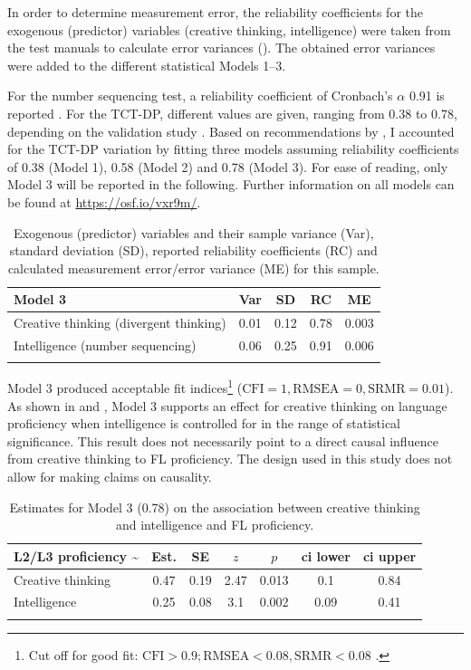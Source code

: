 \documentclass[output=paper]{langsci/langscibook}
\begin{document}
In order to determine measurement error, the reliability coefficients for the exogenous (predictor) variables (creative thinking, intelligence) were taken from the test manuals to calculate error variances (). The obtained error variances were added to the different statistical Models 1--3. 

For the number sequencing test, a reliability coefficient of Cronbach's $\alpha$ 0.91 is reported \citep{Weiss2006}. For the TCT-DP, different values are given, ranging from 0.38 to 0.78, depending on the validation study \citep{UrbanJellen1995}. Based on recommendations by \citet{WestfallYarkoni2016}, I accounted for the TCT-DP variation by fitting three models assuming reliability coefficients of 0.38 (Model 1), 0.58 (Model 2) and 0.78 (Model 3). For ease of reading, only Model 3 will be reported in the following. Further information on all models can be found at \url{https://osf.io/vxr9m/}.\largerpage 

\begin{table}
\caption{\label{tab:06:1}Exogenous (predictor) variables and their sample variance (Var), standard deviation (SD), reported reliability coefficients (RC) and calculated measurement error/error variance (ME) for this sample.}
\begin{tabular}{l cccc} 
\lsptoprule
Model 3 & {Var} & {SD} & {RC} & {ME} \\\midrule
Creative thinking (divergent thinking)      & 0.01 & 0.12 & 0.78 & 0.003\\
Intelligence (number sequencing)         & 0.06 & 0.25 & 0.91 & 0.006\\
\lspbottomrule
\end{tabular}
\end{table}

Model 3 produced acceptable fit indices\footnote{Cut off for good fit: $\text{CFI} > 0.9; \text{RMSEA} < 0.08, \text{SRMR} < 0.08$ \citep{Kline2011}.} ($\text{CFI} = 1, \text{RMSEA} = 0, \text{SRMR} = 0.01$). As shown in  and , Model 3 supports an effect for creative thinking on language proficiency when intelligence is controlled for in the range of statistical significance. This result does not necessarily point to a direct causal influence from creative thinking to FL proficiency. The design used in this study does not allow for making claims on causality. 

\begin{table}
\caption{\label{tab:06:2}Estimates for Model 3 (0.78) on the association between creative thinking and intelligence and FL proficiency.}
\begin{tabular}{l SS SS SS}
\lsptoprule
{L2/L3 proficiency {\textasciitilde}} & {Est.} & {SE} & {$z$} & {$p$} & {ci lower} & {ci upper}\\\midrule
Creative thinking & 0.47 & 0.19 & 2.47 & 0.013 & 0.1 & 0.84\\
Intelligence      & 0.25 & 0.08 & 3.1 & 0.002 & 0.09 & 0.41\\
\lspbottomrule
\end{tabular}
\end{table}
\end{document}
